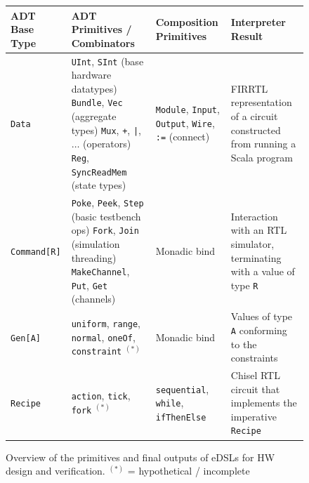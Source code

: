 \documentclass[sigplan,review,nonacm,9pt]{acmart}
\newcommand\aste{%
$^{(\ast)}$
}
\begin{document}
\begin{figure}
\small
\begin{tabular}{p{3cm}>{\raggedright\arraybackslash}p{5cm}>{\raggedright\arraybackslash}p{4cm}>{\raggedright\arraybackslash}p{4cm}}\toprule
ADT Base Type & ADT Primitives / Combinators & Composition Primitives & Interpreter Result\\\midrule
\texttt{Data} \cite{chisel} & \texttt{UInt}, \texttt{SInt} (base hardware datatypes) \newline \texttt{Bundle}, \texttt{Vec} (aggregate types) \newline \texttt{Mux}, \texttt{+}, \texttt{|}, $\dots$ (operators) \newline \texttt{Reg}, \texttt{SyncReadMem} (state types) & \texttt{Module}, \texttt{Input}, \texttt{Output}, \texttt{Wire}, \texttt{:=} (connect) & FIRRTL representation of a circuit constructed from running a Scala program \\\midrule
\texttt{Command[R]} \cite{simcommand} & \texttt{Poke}, \texttt{Peek}, \texttt{Step} (basic testbench ops) \newline \texttt{Fork}, \texttt{Join} (simulation threading) \newline \texttt{MakeChannel}, \texttt{Put}, \texttt{Get} (channels) & Monadic bind & Interaction with an RTL simulator, terminating with a value of type \texttt{R}\\\midrule
\texttt{Gen[A]} \cite{randomapi} & \texttt{uniform}, \texttt{range}, \texttt{normal}, \texttt{oneOf}, \texttt{constraint}\aste & Monadic bind & Values of type \texttt{A} conforming to the constraints\\\midrule
\texttt{Recipe} \cite{chisel_recipes} & \texttt{action}, \texttt{tick}, \texttt{fork}\aste & \texttt{sequential}, \texttt{while}, \texttt{ifThenElse} & Chisel RTL circuit that implements the imperative \texttt{Recipe} \\
\bottomrule
\end{tabular}
\caption{Overview of the primitives and final outputs of eDSLs for HW design and verification. {\small \aste = hypothetical / incomplete}}
\end{figure}
\end{document}
